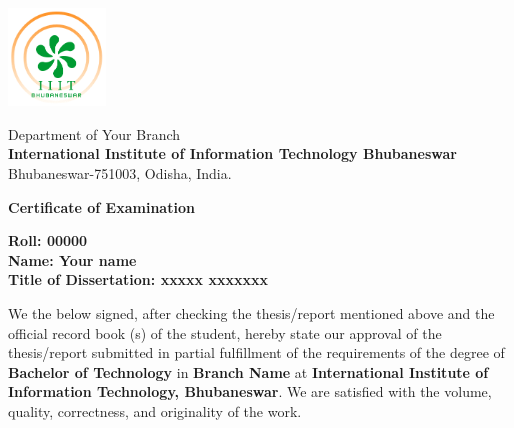 \thispagestyle{empty} 
\begin{minipage}{.1\linewidth}
\hspace*{-.6cm}\includegraphics[height=2.6cm]{front/IIIT_Bhubaneswar_Logo}
\end{minipage}
\hspace{.4cm}
\begin{minipage}{1\linewidth}
{\normalsize
\textsf{Department of Your Branch\\
\textbf{International Institute of Information Technology Bhubaneswar\\}}}
{\normalsize
\textsf{
Bhubaneswar-751003, Odisha, India.}}
\end{minipage}
\vspace{.3in}

\fontsize{12}{14}
\selectfont
\begin{flushright}
\end{flushright}
\vspace{.1in}
\centerline{\Large{\bf Certificate of Examination}}
\vspace{0.1in}

\begin{flushleft}
	\fontsize{11}{10}
	\selectfont
		\textbf{Roll: 00000}\\
		\textbf{Name: Your name}\\
		\textbf{Title of Dissertation: xxxxx xxxxxxx}\\
\end{flushleft}

\noindent
We the below signed, after checking the thesis/report mentioned above and the official record book (s) of the student, hereby state our approval of the thesis/report submitted in partial
fulfillment of the requirements of the degree of {\bf Bachelor of Technology} in {\bf Branch Name} at {\bf International Institute of Information Technology, Bhubaneswar}. We are satisfied with the volume, quality, correctness, and originality of the work.

